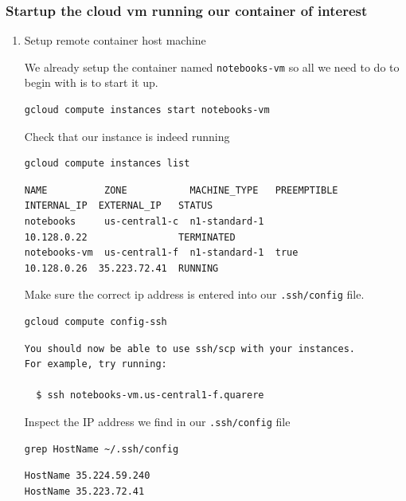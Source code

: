 \documentclass[11pt]{article}
\begin{document}
\subsubsection{Startup the cloud vm running our container of interest}
\label{sec:orgfa41a04}
\begin{enumerate}
\item Setup remote container host machine
\label{sec:orga346471}

We already setup the container named \texttt{notebooks-vm} so all we need to do to begin with is to start it up.

\begin{verbatim}
gcloud compute instances start notebooks-vm
\end{verbatim}

Check that our instance is indeed running

\begin{verbatim}
gcloud compute instances list
\end{verbatim}

\begin{verbatim}
NAME          ZONE           MACHINE_TYPE   PREEMPTIBLE  INTERNAL_IP  EXTERNAL_IP   STATUS
notebooks     us-central1-c  n1-standard-1               10.128.0.22                TERMINATED
notebooks-vm  us-central1-f  n1-standard-1  true         10.128.0.26  35.223.72.41  RUNNING
\end{verbatim}


Make sure the correct ip address is entered into our \texttt{.ssh/config} file.
\begin{verbatim}
gcloud compute config-ssh
\end{verbatim}

\begin{verbatim}
You should now be able to use ssh/scp with your instances.
For example, try running:

  $ ssh notebooks-vm.us-central1-f.quarere

\end{verbatim}


Inspect the IP address we find in our \texttt{.ssh/config} file

\begin{verbatim}
grep HostName ~/.ssh/config
\end{verbatim}

\begin{verbatim}
HostName 35.224.59.240
HostName 35.223.72.41
\end{verbatim}


\end{enumerate}
\end{document}
